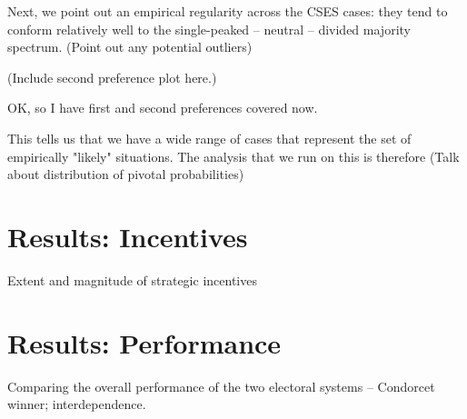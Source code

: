 \documentclass[11pt, letter, margin = 2 in]{article}
\begin{document}
Next, we point out an empirical regularity across the CSES cases: they tend to conform relatively well to the single-peaked -- neutral -- divided majority spectrum. (Point out any potential outliers)

(Include second preference plot here.)

OK, so I have first and second preferences covered now.

This tells us that we have a wide range of cases that represent the set of empirically "likely" situations. The analysis that we run on this is therefore
(Talk about distribution of pivotal probabilities)



\section{Results: Incentives}

Extent and magnitude of strategic incentives

\section{Results: Performance}

Comparing the overall performance of the two electoral systems -- Condorcet winner; interdependence.
\end{document}
